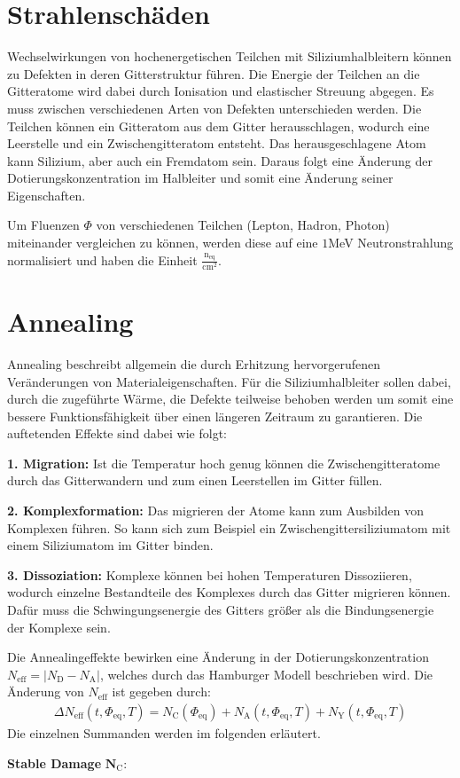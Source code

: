 \section{Strahlenschäden}
Wechselwirkungen von hochenergetischen Teilchen mit Siliziumhalbleitern können zu Defekten in deren
Gitterstruktur führen.
Die Energie der Teilchen an die Gitteratome wird dabei durch Ionisation und elastischer Streuung abgegen.
Es muss zwischen verschiedenen Arten von Defekten unterschieden werden. Die Teilchen können ein Gitteratom aus dem
Gitter herausschlagen, wodurch eine Leerstelle und ein Zwischengitteratom entsteht. Das herausgeschlagene Atom
kann Silizium, aber auch ein Fremdatom sein. Daraus folgt eine Änderung der Dotierungskonzentration im
Halbleiter und somit eine Änderung seiner Eigenschaften.

Um Fluenzen $ \Phi$ von verschiedenen Teilchen (Lepton, Hadron, Photon) miteinander vergleichen zu können, werden diese
auf eine $1$MeV Neutronstrahlung normalisiert und haben die Einheit $\mathrm{\frac{n_{\mathrm{eq}}}{cm^2}}$.


\section{Annealing}
Annealing beschreibt allgemein die durch Erhitzung hervorgerufenen Veränderungen von Materialeigenschaften. Für die
Siliziumhalbleiter sollen dabei, durch die zugeführte Wärme, die Defekte teilweise behoben werden um somit eine
bessere Funktionsfähigkeit über einen längeren Zeitraum zu garantieren. Die auftetenden Effekte sind dabei wie folgt:

\textbf{1. Migration:} Ist die Temperatur hoch genug können die Zwischengitteratome durch das Gitterwandern und
zum einen Leerstellen im Gitter füllen.

\textbf{2. Komplexformation:} Das migrieren der Atome kann zum Ausbilden von Komplexen führen. So kann sich zum Beispiel ein
Zwischengittersiliziumatom mit einem Siliziumatom im Gitter binden.

\textbf{3. Dissoziation:} Komplexe können bei hohen Temperaturen Dissoziieren, wodurch einzelne Bestandteile des Komplexes
durch das Gitter migrieren können. Dafür muss die Schwingungsenergie des Gitters größer als die Bindungsenergie der Komplexe sein.

Die Annealingeffekte bewirken eine Änderung in der Dotierungskonzentration $N_{\mathrm{eff}}= |N_{\mathrm{D}}-N_{\mathrm{A}}|$, welches durch das Hamburger Modell beschrieben wird.
Die Änderung von $N_{\mathrm{eff}}$ ist gegeben durch:
\begin{align}
  \Delta N_{\mathrm{eff}}(t, \Phi_{\mathrm{eq}}, T)   = N_{\mathrm{C}}(\Phi_{\mathrm{eq}}) + N_{\mathrm{A}}(t, \Phi_{\mathrm{eq}}, T) + N_{\mathrm{Y}}(t, \Phi_{\mathrm{eq}}, T)
\end{align}
Die einzelnen Summanden werden im folgenden erläutert.

\textbf{Stable Damage} $\symbf{N_{\mathrm{C}}}:$
